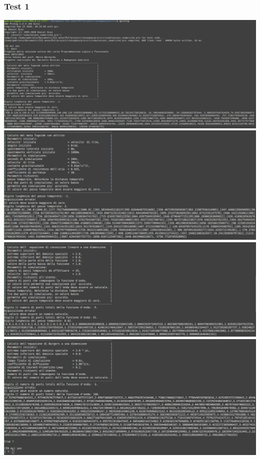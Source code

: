 \subsubsection*{Test 1}
\includegraphics[width=\textwidth,height=\textheight,keepaspectratio]{05_testing/image/pro/01_test/01.png}
\\
\includegraphics[width=\textwidth,height=\textheight,keepaspectratio]{05_testing/image/pro/01_test/02.png}
\\
\includegraphics[width=\textwidth,height=\textheight,keepaspectratio]{05_testing/image/pro/01_test/03.png}
\\
\includegraphics[width=\textwidth,height=\textheight,keepaspectratio]{05_testing/image/pro/01_test/04.png}

